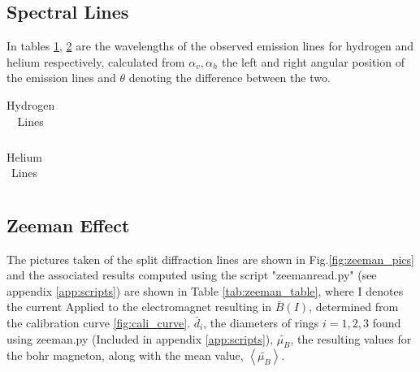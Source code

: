 \documentclass[11pt,a4paper]{article}
\begin{document}
    \subsection{\label{subsect:spectral}Spectral Lines}

    In tables \ref{tab:hydrogen}, \ref{tab:helium} are the wavelengths of the observed emission lines for hydrogen and helium respectively, calculated from $\alpha_v, \alpha_h$ the left and right angular position of the emission lines and $\theta$ denoting the difference between the two.
    
    \begin{table}[H]
        \center
        \caption{Hydrogen Lines}
        \begin{tabular}{ l l l l}
        
        \end{tabular}
        \label{tab:hydrogen}
    \end{table}

    \begin{table}[H]
        \center
        \caption{Helium Lines}
        \begin{tabular}{ l l l l}
            
        \end{tabular}
        \label{tab:helium}
    \end{table}

    \subsection{\label{subsect:res_Zeeman}Zeeman Effect}

      The pictures taken of the split diffraction lines are shown in Fig.\ref{fig:zeeman_pics} and the associated results computed using the script "zeemanread.py" (see appendix \ref{app:scripts}) are shown in Table \ref{tab:zeeman_table}, where I denotes the current Applied to the electromagnet resulting in $\bar B(I)$, determined from the calibration curve \ref{fig:cali_curve}. $\bar d_i$, the diameters of rings $i=1,2,3$ found using zeeman.py (Included in appendix \ref{app:scripts}), $\tilde{\mu_B}$, the resulting values for the bohr magneton, along with the mean value, $\left<\tilde{\mu_B}\right>$.
\end{document}
